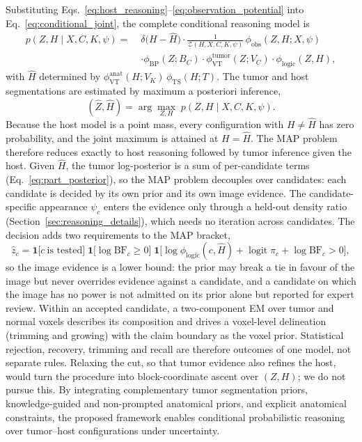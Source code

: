 \documentclass[fleqn,10pt]{olplainarticle}
\begin{document}
Substituting Eqs.~\eqref{eq:host_reasoning}--\eqref{eq:observation_potential}
into Eq.~\eqref{eq:conditional_joint}, the complete
conditional reasoning model is
\begin{equation}
\label{eq:expanded_reasoning}
\boxed{
\begin{aligned}
p(Z,H\mid X,C,K,\psi)
=\;&\delta\bigl(H-\hat H\bigr)\cdot
\frac{1}{\mathcal{Z}(H,X,C,K,\psi)}\,
\phi_{\mathrm{obs}}(Z,H;X,\psi) \\
&\cdot\phi_{\mathrm{BP}}(Z;B_C) \cdot\phi_{\mathrm{VT}}^{\mathrm{tumor}}
(Z;V_C) \cdot\phi_{\mathrm{logic}}(Z,H),
\end{aligned}
}
\end{equation}
with $\hat H$ determined by
$\phi_{\mathrm{VT}}^{\mathrm{anat}}(H;V_K)\,\phi_{\mathrm{TS}}(H;T)$.
The tumor and host segmentations are estimated by
maximum a posteriori inference,
\begin{equation}
\label{eq:map_inference}
(\hat Z,\hat H)
=
\arg\max_{Z,H}\;
p(Z,H\mid X,C,K,\psi).
\end{equation}
Because the host model is a point mass, every
configuration with $H\neq\hat H$ has zero probability,
and the joint maximum is attained at $H=\hat H$.
The MAP problem therefore reduces exactly to host
reasoning followed by tumor inference given the host.
Given $\hat H$, the tumor log-posterior is a sum of per-candidate terms (Eq.~\eqref{eq:part_posterior}), so the MAP
problem decouples over candidates: each candidate is decided by its own prior and its own image evidence. The
candidate-specific appearance $\psi_c$ enters the evidence only through a held-out density ratio
(Section~\ref{sec:reasoning_details}), which needs no iteration across candidates. The decision adds two requirements to
the MAP bracket,
\begin{equation}
\label{eq:log_inference}
\hat z_c=\mathbf{1}\bigl[c\ \text{is tested}\bigr]\;
\mathbf{1}\bigl[\log\mathrm{BF}_c\ge0\bigr]\;
\mathbf{1}\bigl[\log\phi_{\mathrm{logic}}(c,\hat H)+\operatorname{logit}\pi_c+\log\mathrm{BF}_c>0\bigr],
\end{equation}
so the image evidence is a lower bound: the prior may break a tie in favour of the image but never overrides evidence
against a candidate, and a candidate on which the image has no power is not admitted on its prior alone but reported
for expert review. Within an accepted candidate, a two-component EM over tumor and normal voxels describes its
composition and drives a voxel-level delineation (trimming and growing) with the claim boundary as the voxel prior.
Statistical rejection, recovery, trimming and recall are therefore outcomes of one model, not separate rules.
Relaxing the cut, so that tumor evidence also refines the
host, would turn the procedure into block-coordinate
ascent over $(Z,H)$; we do not pursue this.
By integrating complementary tumor
segmentation priors, knowledge-guided
and non-prompted anatomical priors,
and explicit anatomical constraints,
the proposed framework enables
conditional probabilistic reasoning
over tumor--host configurations
under uncertainty.
\end{document}
